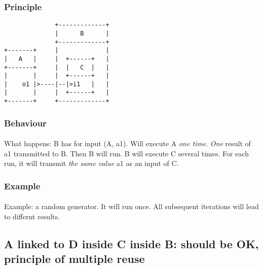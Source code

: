 \documentclass[a4paper,10pt]{book}
\begin{document}
\subsubsection{Principle}
% 
% 
% 

\begin{verbatim}
              +-------------+
              |      B      |
              +-------------+
+-------+     |             |
|   A   |     |  +------+   |
+-------+     |  |   C  |   |
|       |     |  +------+   |
|    o1 |>----|--|>i1   |   |
|       |     |  +------+   |
+-------+     +-------------+
\end{verbatim} 


\subsubsection{Behaviour}

\paragraph*{}
What happens: B has for input (A, a1).
Will execute A \textit{one time}. \textit{One} result of a1 transmitted to B.
Then B will run. B will execute C several times. For each run, it will transmit \textit{the same value} a1 as an input of C.

\subsubsection{Example}

\paragraph*{}
Example: a random generator. It will run once. All subsequent iterations will lead to differnt results.


\subsection{A linked to D inside C inside B: should be OK, principle of multiple reuse}
\end{document}
